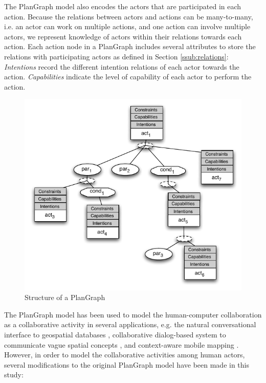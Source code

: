 The PlanGraph model also encodes the actors that are participated in each action. Because the relations between actors and actions can be many-to-many, i.e. an actor can work on multiple actions, and one action can involve multiple actors, we represent knowledge of actors within their relations towards each action. Each action node in a PlanGraph includes several attributes to store the relations with participating actors as defined in Section \ref{ssub:relations}: \emph{Intentions} record the different intention relations of each actor towards the action. \emph{Capabilities} indicate the level of capability of each actor to perform the action.

\begin{figure}[htbp] %
   \centering
   \includegraphics{plangraph.pdf} 
   \caption{Structure of a PlanGraph}
   \label{fig:plangraph}
\end{figure}

The PlanGraph model has been used to model the human-computer collaboration as a collaborative activity in several applications, e.g. the natural conversational interface to geospatial databases \cite{Cai2005}, collaborative dialog-based system to communicate vague spatial concepts \cite{Cai2003}, and context-aware mobile mapping \cite{yu2010using}. However, in order to model the collaborative activities among human actors, several modifications to the original PlanGraph model have been made in this study:

